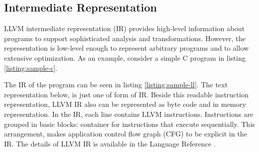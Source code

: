\subsection{Intermediate Representation}

LLVM intermediate representation (IR) provides high-level information about programs to support sophisticated analysis and transformations. However, the representation is low-level enough to represent arbitrary programs and to allow extensive optimization. As an example, consider a simple C program in listing \ref{listing:sample-c}.


The IR of the program can be seen in listing \ref{listing:sample-ll}. The text representation below, is just one of form of IR. Beside this readable instruction representation, LLVM IR also can be represented as byte code and in memory representation. In the IR, each line contains LLVM instructions. Instructions are grouped in basic blocks: container for instructions that execute sequentially. This arrangement, makes application control flow graph (CFG) to be explicit in the IR. The details of LLVM IR is available in the Language Reference \cite{LLVMLanguageReferencea}.



